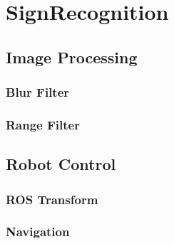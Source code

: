 \chapter{SignRecognition}
\graphicspath{{./Software/img/}}
 
\section{Image Processing}
\subsection{Blur Filter}
\subsection{Range Filter}

\section{Robot Control}
\subsection{ROS Transform}
\subsection{Navigation}
